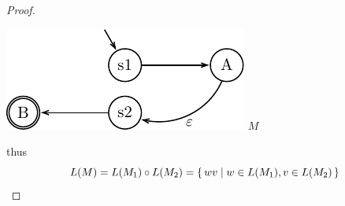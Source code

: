 \begin{example}
\begin{proof}
\begin{center}
\begin{minipage}{4cm}
                \includegraphics[width=\textwidth]{pics/mp/nfa-6.pdf}
                \center $M$
            \end{minipage}
        \end{center}
        thus 
        \[
            L(M) = L(M_1) \circ L(M_2)  = { \left\{\,wv \mid w \in L(M_1), v \in L(M_2)\,\right\} }
        \]
    \end{proof}
\end{example}



